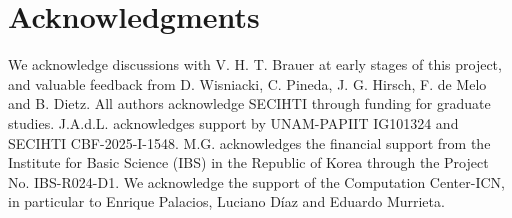 \documentclass[pra,twocolumn,aps,showpacs,superscriptaddress,longbibliography]{revtex4-2}
\begin{document}
%
\section*{Acknowledgments}
We acknowledge discussions with V. H. T. Brauer at early stages of this project, and valuable feedback from D. Wisniacki, C. Pineda, J. G. Hirsch, F. de Melo and B. Dietz.
All authors acknowledge SECIHTI through funding for graduate studies.
J.A.d.L. acknowledges support by UNAM-PAPIIT IG101324 and SECIHTI CBF-2025-I-1548. M.G. acknowledges the financial support from the Institute for Basic Science (IBS) in the Republic of Korea through the Project No. IBS-R024-D1. We acknowledge the support of the Computation Center-ICN, in particular to Enrique Palacios, Luciano Díaz and Eduardo Murrieta.

%

\appendix
% 

\end{document}
